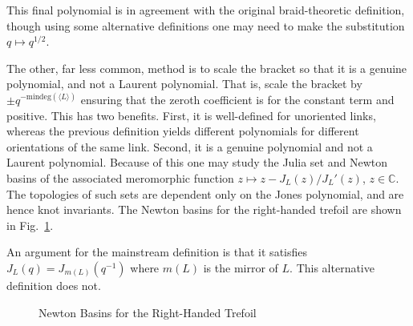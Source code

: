         This final polynomial is in agreement with the original braid-theoretic
        definition, though using some alternative definitions one may need to
        make the substitution $q\mapsto{q}^{1/2}$.
        \par\hfill\par
        The other, far less common, method is to scale the bracket so that
        it is a genuine polynomial, and not a Laurent polynomial. That is,
        scale the bracket by $\pm{q}^{-\textrm{mindeg}(\langle{L}\rangle)}$
        ensuring that the zeroth coefficient is for the constant term and
        positive. This has two benefits. First, it is well-defined for
        unoriented links, whereas
        the previous definition yields different polynomials for different
        orientations of the same link. Second, it is a genuine polynomial and
        not a Laurent polynomial. Because of this one may study the Julia set
        and Newton basins of the associated meromorphic function
        $z\mapsto{z}-J_{L}(z)/J_{L}'(z)$, $z\in\mathbb{C}$. The topologies of
        such sets are dependent only on the Jones polynomial, and
        are hence knot invariants. The Newton basins for the right-handed
        trefoil are shown in
        Fig.~\ref{fig:newton_fractal_right_trefoil_jones}.
        \par\hfill\par
        An argument for the mainstream definition is that it satisfies
        $J_{L}(q)=J_{m(L)}(q^{-1})$ where $m(L)$ is the mirror of $L$. This
        alternative definition does not.
        \begin{figure}
            \centering
            \caption{Newton Basins for the Right-Handed Trefoil}
            \label{fig:newton_fractal_right_trefoil_jones}
        \end{figure}
